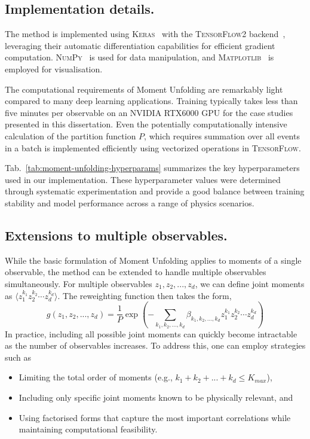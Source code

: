     \subsection{Implementation details.}
        The method is implemented using \textsc{Keras}~\cite{chollet2015keras} with the \textsc{TensorFlow2} backend~\cite{Abadi2016TensorFlow:Learning}, leveraging their automatic differentiation capabilities for efficient gradient computation.
        \textsc{NumPy}~\cite{Harris2020ArrayNumPy} is used for data manipulation, and \textsc{Matplotlib}~\cite{Hunter2007Matplotlib:Environment} is employed for visualisation.

        The computational requirements of Moment Unfolding are remarkably light compared to many deep learning applications.
        Training typically takes less than five minutes per observable on an NVIDIA RTX6000 GPU for the case studies presented in this dissertation.
       Even the potentially computationally intensive calculation of the partition function $P$, which requires summation over all events in a batch is implemented efficiently using vectorized operations in \textsc{TensorFlow}.

        Tab.~\ref{tab:moment-unfolding-hyperparams} summarizes the key hyperparameters used in our implementation.
        These hyperparameter values were determined through systematic experimentation and provide a good balance between training stability and model performance across a range of physics scenarios.



    \subsection{Extensions to multiple observables.}
        While the basic formulation of Moment Unfolding applies to moments of a single observable, the method can be extended to handle multiple observables simultaneously.
        For multiple observables $z_1, z_2, ..., z_d$, we can define joint moments as \(\langle z_1^{k_1} z_2^{k_2} \cdots z_d^{k_d} \rangle.\)
        The reweighting function then takes the form,
        \[
            g(z_1, z_2, ..., z_d) = \frac{1}{P}\exp\left(-\sum_{k_1, k_2, ..., k_d} \beta_{k_1, k_2, ..., k_d} z_1^{k_1} z_2^{k_2} \cdots z_d^{k_d}\right)
        \]
        In practice, including all possible joint moments can quickly become intractable as the number of observables increases.
        To address this, one can employ strategies such as
        \begin{itemize}
            \item Limiting the total order of moments (e.g., $k_1 + k_2 + ... + k_d \leq K_{max}$),
            \item Including only specific joint moments known to be physically relevant, and
            \item Using factorised forms that capture the most important correlations while maintaining computational feasibility.
        \end{itemize}
